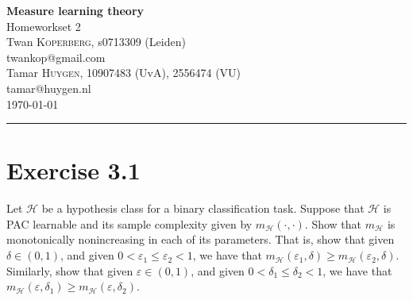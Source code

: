 \documentclass[10pt, a4paper, twoside]{amsart}
\makeatletter
\newcommand{\firstName}  {Twan}
\newcommand{\lastName}   {Koperberg}
\newcommand{\studId}     {0713309 (Leiden)}
\renewcommand{\email}    {twankop@gmail.com}
\newcommand{\firstNameII}  {Tamar}
\newcommand{\lastNameII}   {Huygen}
\newcommand{\studIdII}     {10907483 (UvA)}
\newcommand{\studIdIII}    {2556474 (VU)}
\newcommand{\emailII}     {tamar@huygen.nl}
\makeatother
\begin{document}
\begin{center}

  {\huge\bf Measure learning theory}\\
  {\large\sc Homeworkset 2 }\\ \vspace{1em}
  \firstName \textsc{ \lastName}, {\sc s}\studId \\
  \email\text{}\\ \smallskip
  \firstNameII \textsc{ \lastNameII}, \studIdII, \studIdIII\\
  \emailII \\ \bigskip
  \today \\\bigskip
  \hrule
  \bigskip
\end{center}


\section*{Exercise 3.1} 
Let $\mathcal{H}$ be a hypothesis class for a binary classification task. Suppose that $\mathcal{H}$ is PAC learnable and its sample complexity given by $m_{\mathcal{H}}(\cdot,\cdot)$.
Show that $m_{\mathcal{H}}$ is monotonically nonincreasing in each of its parameters. That is, show that given $\delta \in (0,1)$, and given $0<\varepsilon_1 \leq \varepsilon_2<1$, we have that $m_{\mathcal{H}}(\varepsilon_1, \delta) \geq m_{\mathcal{H}}(\varepsilon_2, \delta)$. Similarly, show that given $\varepsilon \in (0,1)$, and given $0<\delta_1 \leq \delta_2 <1$, we have that $m_{\mathcal{H}}(\varepsilon, \delta_1) \geq m_{\mathcal{H}}(\varepsilon, \delta_2)$.
\end{document}
